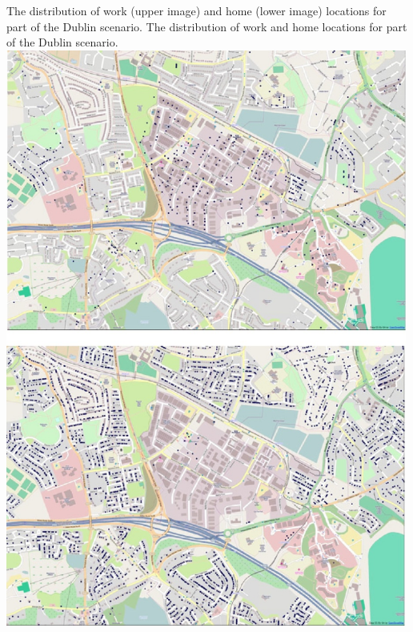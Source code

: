 \createfigure%
{The distribution of work (upper image) and home (lower image) locations for part of the Dublin scenario.}%
{The distribution of work and home locations for part of the Dublin scenario.}%
{\label{fig:dublin0}}%
{\includegraphics[width=0.99\textwidth, angle=0]{using/figures/dublin0.png}}%
{}

